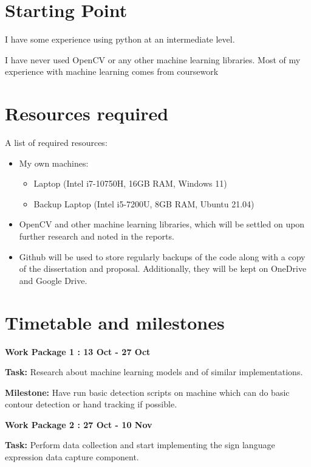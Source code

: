 \documentclass[12pt,a4paper,twoside]{article}
\begin{document}
\section*{Starting Point}

I have some experience using python at an intermediate level.

I have never used OpenCV or any other machine learning libraries. Most of my experience with machine learning comes from coursework

\section*{Resources required}

A list of required resources:

\begin{itemize}
    \item My own machines:
          \begin{itemize}
              \item Laptop (Intel i7-10750H, 16GB RAM, Windows 11)
              \item Backup Laptop (Intel i5-7200U, 8GB RAM, Ubuntu 21.04)
          \end{itemize}
    \item OpenCV and other machine learning libraries, which will be settled on upon further research and noted in the reports.
    \item Github will be used to store regularly backups of the code along with a copy of the dissertation and proposal. Additionally, they will be kept on OneDrive and Google Drive.
\end{itemize}


\section*{Timetable and milestones}

\textbf{Work Package 1 : 13 Oct - 27 Oct}

\textbf{Task: }Research about machine learning models and of similar implementations.

\textbf{Milestone: }Have run basic detection scripts on machine which can do basic contour detection or hand tracking if possible.

\bigskip

\textbf{Work Package 2 : 27 Oct - 10 Nov}

\textbf{Task: }Perform data collection and start implementing the sign language expression data capture component.
\end{document}
